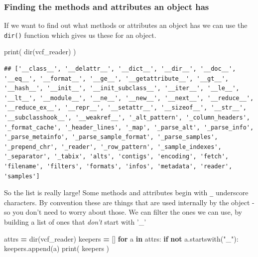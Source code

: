 \documentclass[]{book}
\newenvironment{Shaded}{\begin{snugshade}}{\end{snugshade}}
\newcommand{\BuiltInTok}[1]{#1}
\newcommand{\ControlFlowTok}[1]{\textcolor[rgb]{0.13,0.29,0.53}{\textbf{#1}}}
\newcommand{\KeywordTok}[1]{\textcolor[rgb]{0.13,0.29,0.53}{\textbf{#1}}}
\newcommand{\NormalTok}[1]{#1}
\newcommand{\OperatorTok}[1]{\textcolor[rgb]{0.81,0.36,0.00}{\textbf{#1}}}
\newcommand{\StringTok}[1]{\textcolor[rgb]{0.31,0.60,0.02}{#1}}
\theoremstyle{definition}
\theoremstyle{definition}
\theoremstyle{definition}
\theoremstyle{remark}
\begin{document}
\hypertarget{finding-the-methods-and-attributes-an-object-has}{%
\subsubsection{Finding the methods and attributes an object
has}\label{finding-the-methods-and-attributes-an-object-has}}

If we want to find out what methods or attributes an object has we can
use the \texttt{dir()} function which gives us these for an object.

\begin{Shaded}
\begin{Highlighting}[]
\BuiltInTok{print}\NormalTok{( }\BuiltInTok{dir}\NormalTok{(vcf_reader) )}
\end{Highlighting}
\end{Shaded}

\begin{verbatim}
## ['__class__', '__delattr__', '__dict__', '__dir__', '__doc__', '__eq__', '__format__', '__ge__', '__getattribute__', '__gt__', '__hash__', '__init__', '__init_subclass__', '__iter__', '__le__', '__lt__', '__module__', '__ne__', '__new__', '__next__', '__reduce__', '__reduce_ex__', '__repr__', '__setattr__', '__sizeof__', '__str__', '__subclasshook__', '__weakref__', '_alt_pattern', '_column_headers', '_format_cache', '_header_lines', '_map', '_parse_alt', '_parse_info', '_parse_metainfo', '_parse_sample_format', '_parse_samples', '_prepend_chr', '_reader', '_row_pattern', '_sample_indexes', '_separator', '_tabix', 'alts', 'contigs', 'encoding', 'fetch', 'filename', 'filters', 'formats', 'infos', 'metadata', 'reader', 'samples']
\end{verbatim}

So the list is really large! Some methods and attributes begin with
\texttt{\_} underscore characters. By convention these are things that
are used internally by the object - so you don't need to worry about
those. We can filter the ones we can use, by building a list of ones
that \emph{don't} start with '\_'

\begin{Shaded}
\begin{Highlighting}[]
\NormalTok{attrs }\OperatorTok{=} \BuiltInTok{dir}\NormalTok{(vcf_reader)}
\NormalTok{keepers }\OperatorTok{=}\NormalTok{ []}
\ControlFlowTok{for}\NormalTok{ a }\KeywordTok{in}\NormalTok{ attrs:}
  \ControlFlowTok{if} \KeywordTok{not}\NormalTok{ a.startswith(}\StringTok{"_"}\NormalTok{):}
\NormalTok{    keepers.append(a)}
\BuiltInTok{print}\NormalTok{( keepers )}
\end{Highlighting}
\end{Shaded}
\end{document}
